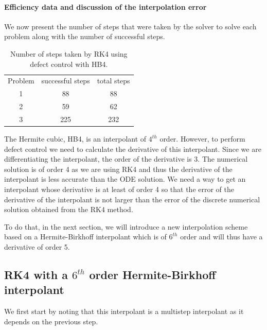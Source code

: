 \paragraph{Efficiency data and discussion of the interpolation error}
We now present the number of steps that were taken by the solver to solve each problem along with the number of successful steps.

\begin{table}[h]
\caption {Number of steps taken by RK4 using defect control with HB4.} \label{tab:rk4_with_hb4_nsteps}
\begin{center}
\begin{tabular}{ c c c } 
Problem & successful steps & total steps \\ 
1       & 88                         & 88 \\ 
2       & 59                         & 62 \\
3       & 225                        & 232 \\
\end{tabular}
\end{center}
\end{table}

The Hermite cubic, HB4, is an interpolant of $4^{th}$ order. However, to perform defect control we need to calculate the derivative of this interpolant. Since we are differentiating the interpolant, the order of the derivative is 3. The numerical solution is of order 4 as we are using RK4 and thus the derivative of the interpolant is less accurate than the ODE solution. We need a way to get an interpolant whose derivative is at least of order 4 so that the error of the derivative of the interpolant is not larger than the error of the discrete numerical solution obtained from the RK4 method.

To do that, in the next section, we will introduce a new interpolation scheme based on a Hermite-Birkhoff interpolant which is of $6^{th}$ order and will thus have a derivative of order 5.

\subsection{RK4 with a $6^{th}$ order Hermite-Birkhoff interpolant}
We first start by noting that this interpolant is a multistep interpolant as it depends on the previous step.

